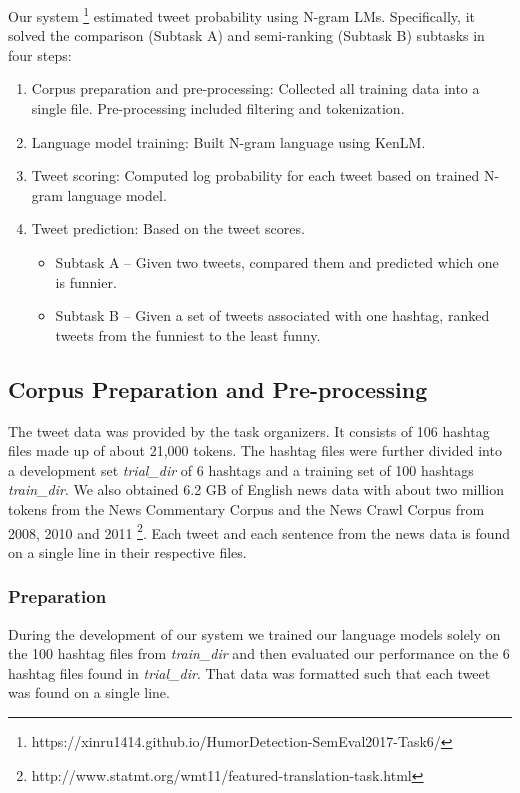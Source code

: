 \documentclass[11pt,a4paper]{article}
\begin{document}
Our system \footnote{https://xinru1414.github.io/HumorDetection-SemEval2017-Task6/} estimated tweet probability using N-gram LMs. 
Specifically, it solved the comparison (Subtask A) and semi-ranking (Subtask B) subtasks in four steps:

\begin{enumerate}
\item Corpus preparation and pre-processing: Collected all training data into a single file.
Pre-processing included filtering and tokenization.
\item Language model training: Built N-gram language using KenLM.
\item Tweet scoring: Computed log probability for each tweet based on trained N-gram 
language model. 
\item Tweet prediction: Based on the tweet scores.   

\begin{itemize}
\item Subtask A -- Given two tweets, compared them and predicted which one is funnier. 
\item Subtask B -- Given a set of tweets associated with one hashtag, ranked 
tweets from the funniest to the least funny.

\end{itemize}
\end{enumerate}

\subsection{Corpus Preparation and Pre-processing}

The tweet data was provided by the task organizers. It consists of 106 hashtag files made up of about 21,000 tokens. The hashtag files
were further divided into a development set \textit{trial\_dir} of 6 hashtags and a training set of 100 hashtags \textit{train\_dir}. 
We also obtained 6.2 GB of English news data with about two million tokens from the News 
Commentary Corpus and the News Crawl Corpus from 2008, 2010 and 2011 \footnote{http://www.statmt.org/wmt11/featured-translation-task.html}.   
Each tweet and each sentence from the news data is found on a single line in their respective files.

\subsubsection{Preparation}

During the development of our system we trained our language models solely on the 100 hashtag files from \textit{train\_dir}
and then evaluated our performance on the 6 hashtag files found in \textit{trial\_dir}. That data was formatted such that each
tweet was found on a single line.  
\end{document}

